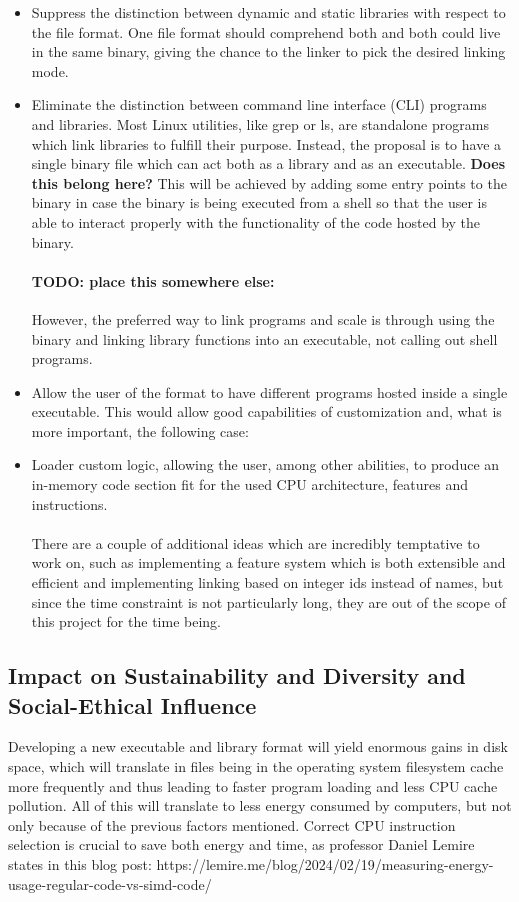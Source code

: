 \documentclass[12pt]{article}
\begin{document}
	\begin{itemize}
		\item Suppress the distinction between dynamic and static libraries with respect to the file format. One file format should comprehend both and both could live in the same binary, giving the chance to the linker to pick the desired linking mode.
		\item Eliminate the distinction between command line interface (CLI) programs and libraries. Most Linux utilities, like grep or ls, are standalone programs which link libraries to fulfill their purpose. Instead, the proposal is to have a single binary file which can act both as a library and as an executable. \textbf{Does this belong here?} This will be achieved by adding some entry points to the binary in case the binary is being executed from a shell so that the user is able to interact properly with the functionality of the code hosted by the binary.
		\paragraph{TODO: place this somewhere else:}However, the preferred way to link programs and scale is through using the binary and linking library functions into an executable, not calling out shell programs.
		\item Allow the user of the format to have different programs hosted inside a single executable. This would allow good capabilities of customization and, what is more important, the following case:
		\item Loader custom logic, allowing the user, among other abilities, to produce an in-memory code section fit for the used CPU architecture, features and instructions.
		\paragraph{} There are a couple of additional ideas which are incredibly temptative to work on, such as implementing a feature system which is both extensible and efficient and implementing linking based on integer ids instead of names, but since the time constraint is not particularly long, they are out of the scope of this project for the time being.
	\end{itemize}
	\subsection{Impact on Sustainability and Diversity and Social-Ethical Influence}
    Developing a new executable and library format will yield enormous gains in disk space, which will translate in files being in the operating system filesystem cache more frequently and thus leading to faster program loading and less CPU cache pollution. All of this will translate to less energy consumed by computers, but not only because of the previous factors mentioned. Correct CPU instruction selection is crucial to save both energy and time, as professor Daniel Lemire states in this blog post: https://lemire.me/blog/2024/02/19/measuring-energy-usage-regular-code-vs-simd-code/
\end{document}
